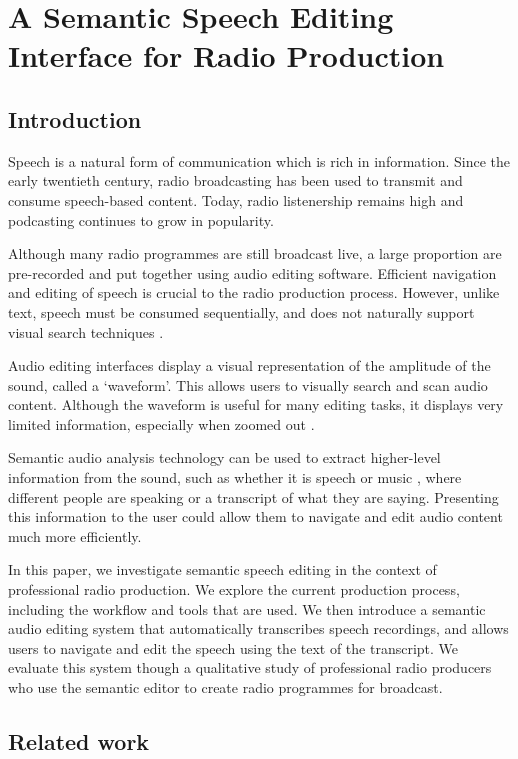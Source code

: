 \chapter{A Semantic Speech Editing Interface for Radio Production}

\section{Introduction}
Speech is a natural form of communication which is rich in information. Since
the early twentieth century, radio broadcasting has been used to transmit and
consume speech-based content. Today, radio listenership remains high and
podcasting continues to grow in popularity. 

Although many radio programmes are still broadcast live, a large proportion are
pre-recorded and put together using audio editing software. Efficient
navigation and editing of speech is crucial to the radio production process.
However, unlike text, speech must be consumed sequentially, and does not
naturally support visual search techniques \cite{Wolfe2004}. 

Audio editing interfaces display a visual representation of the amplitude of
the sound, called a `waveform'. This allows users to visually search and scan
audio content. Although the waveform is useful for many editing tasks, it
displays very limited information, especially when zoomed out
\cite{Loviscach2011}.

Semantic audio analysis technology can be used to extract higher-level
information from the sound, such as whether it is speech or music
\cite{Panagiotakis2005}, where different people are speaking
\cite{AngueraMiro2012} or a transcript of what they are saying. Presenting this
information to the user could allow them to navigate and edit audio content
much more efficiently.

In this paper, we investigate semantic speech editing in the context of
professional radio production. We explore the current production process,
including the workflow and tools that are used. We then introduce a semantic 
audio editing system that automatically transcribes speech recordings, and
allows users to navigate and edit the speech using the text of the transcript.
We evaluate this system though a qualitative study of professional radio
producers who use the semantic editor to create radio programmes for broadcast.


\section{Related work}

